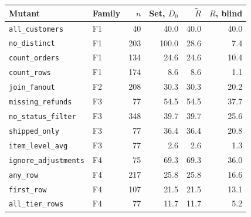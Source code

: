 \begin{tabular}{llrrrr}
\toprule
Mutant & Family & $n$ & Set, $D_0$ & $\tilde R$ & $R$, blind \\
\midrule
\texttt{all\_customers} & F1 & 40 & 40.0 & 40.0 & 40.0 \\
\texttt{no\_distinct} & F1 & 203 & 100.0 & 28.6 & 7.4 \\
\texttt{count\_orders} & F1 & 134 & 24.6 & 24.6 & 10.4 \\
\texttt{count\_rows} & F1 & 174 & 8.6 & 8.6 & 1.1 \\
\texttt{join\_fanout} & F2 & 208 & 30.3 & 30.3 & 20.2 \\
\texttt{missing\_refunds} & F3 & 77 & 54.5 & 54.5 & 37.7 \\
\texttt{no\_status\_filter} & F3 & 348 & 39.7 & 39.7 & 25.6 \\
\texttt{shipped\_only} & F3 & 77 & 36.4 & 36.4 & 20.8 \\
\texttt{item\_level\_avg} & F3 & 77 & 2.6 & 2.6 & 1.3 \\
\texttt{ignore\_adjustments} & F4 & 75 & 69.3 & 69.3 & 36.0 \\
\texttt{any\_row} & F4 & 217 & 25.8 & 25.8 & 16.6 \\
\texttt{first\_row} & F4 & 107 & 21.5 & 21.5 & 13.1 \\
\texttt{all\_tier\_rows} & F4 & 77 & 11.7 & 11.7 & 5.2 \\
\bottomrule
\end{tabular}
